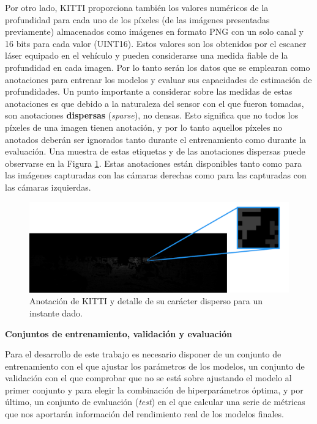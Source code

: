 Por otro lado, KITTI proporciona también los valores numéricos de la profundidad para cada uno de los píxeles (de las imágenes presentadas previamente) almacenados como imágenes en formato PNG con un solo canal y 16 bits para cada valor (UINT16). Estos valores son los obtenidos por el escaner láser equipado en el vehículo y pueden considerarse una medida fiable de la profundidad en cada imagen. Por lo tanto serán los datos que se emplearan como anotaciones para entrenar los modelos y evaluar sus capacidades de estimación de profundidades. Un punto importante a considerar sobre las medidas de estas anotaciones es que debido a la naturaleza del sensor con el que fueron tomadas, son anotaciones \textbf{dispersas} (\textit{sparse}), no densas. Esto significa que no todos los píxeles de una imagen tienen anotación, y por lo tanto aquellos píxeles no anotados deberán ser ignorados tanto durante el entrenamiento como durante la evaluación. Una muestra de estas etiquetas y de las anotaciones dispersas puede observarse en la Figura \ref{fig:kitti_depth}. Estas anotaciones están disponibles tanto como para las imágenes capturadas con las cámaras derechas como para las capturadas con las cámaras izquierdas.

\begin{figure}[H]
\centering
\includegraphics[width=\textwidth]{imagenes/depth67_img3_detail.png}
\caption{Anotación de KITTI y detalle de su carácter disperso para un instante dado.}
\label{fig:kitti_depth}

\end{figure}

\textbf{Conjuntos de entrenamiento, validación y evaluación}

Para el desarrollo de este trabajo es necesario disponer de un conjunto de entrenamiento con el que ajustar los parámetros de los modelos, un conjunto de validación con el que comprobar que no se está sobre ajustando el modelo al primer conjunto y para elegir la combinación de hiperparámetros óptima, y por último, un conjunto de evaluación (\textit{test}) en el que calcular una serie de métricas que nos aportarán información del rendimiento real de los modelos finales.

